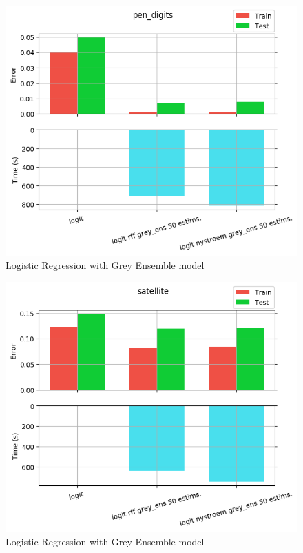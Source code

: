 \begin{figure}[th]
\centering
\includegraphics[scale=\imgscale]{Figures/2_4/pen_digits}
\decoRule
\caption[2.4 pen\tu digits]{Logistic Regression with Grey Ensemble model}
\label{fig:2_4_pen_digits}
\end{figure}

\begin{figure}[th]
\centering
\includegraphics[scale=\imgscale]{Figures/2_4/satellite}
\decoRule
\caption[2.4 satellite]{Logistic Regression with Grey Ensemble model}
\label{fig:2_4_satellite}
\end{figure}

